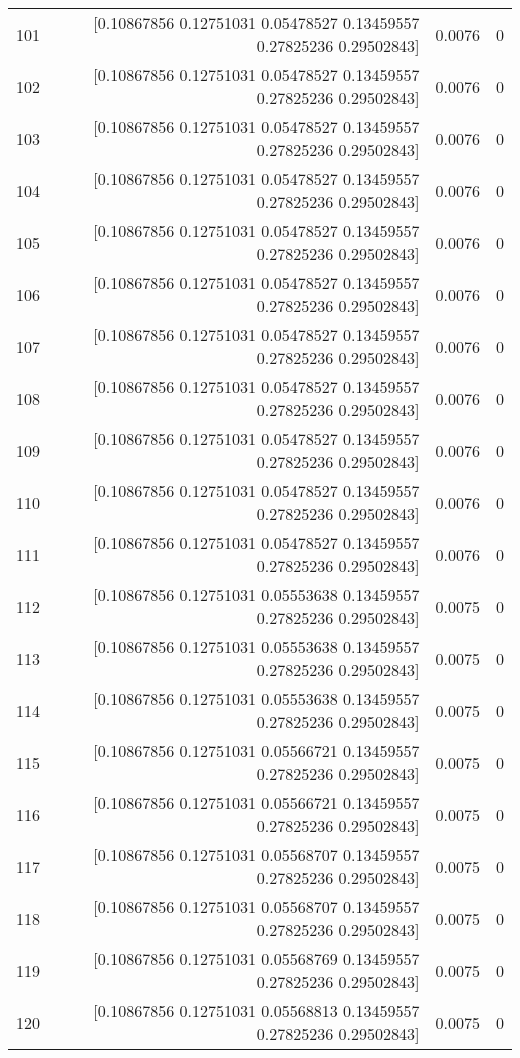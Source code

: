 \begin{longtable}{lrrr}
101 & [0.10867856 0.12751031 0.05478527 0.13459557 0.27825236 0.29502843] & 0.0076 & 0 \\
102 & [0.10867856 0.12751031 0.05478527 0.13459557 0.27825236 0.29502843] & 0.0076 & 0 \\
103 & [0.10867856 0.12751031 0.05478527 0.13459557 0.27825236 0.29502843] & 0.0076 & 0 \\
104 & [0.10867856 0.12751031 0.05478527 0.13459557 0.27825236 0.29502843] & 0.0076 & 0 \\
105 & [0.10867856 0.12751031 0.05478527 0.13459557 0.27825236 0.29502843] & 0.0076 & 0 \\
106 & [0.10867856 0.12751031 0.05478527 0.13459557 0.27825236 0.29502843] & 0.0076 & 0 \\
107 & [0.10867856 0.12751031 0.05478527 0.13459557 0.27825236 0.29502843] & 0.0076 & 0 \\
108 & [0.10867856 0.12751031 0.05478527 0.13459557 0.27825236 0.29502843] & 0.0076 & 0 \\
109 & [0.10867856 0.12751031 0.05478527 0.13459557 0.27825236 0.29502843] & 0.0076 & 0 \\
110 & [0.10867856 0.12751031 0.05478527 0.13459557 0.27825236 0.29502843] & 0.0076 & 0 \\
111 & [0.10867856 0.12751031 0.05478527 0.13459557 0.27825236 0.29502843] & 0.0076 & 0 \\
112 & [0.10867856 0.12751031 0.05553638 0.13459557 0.27825236 0.29502843] & 0.0075 & 0 \\
113 & [0.10867856 0.12751031 0.05553638 0.13459557 0.27825236 0.29502843] & 0.0075 & 0 \\
114 & [0.10867856 0.12751031 0.05553638 0.13459557 0.27825236 0.29502843] & 0.0075 & 0 \\
115 & [0.10867856 0.12751031 0.05566721 0.13459557 0.27825236 0.29502843] & 0.0075 & 0 \\
116 & [0.10867856 0.12751031 0.05566721 0.13459557 0.27825236 0.29502843] & 0.0075 & 0 \\
117 & [0.10867856 0.12751031 0.05568707 0.13459557 0.27825236 0.29502843] & 0.0075 & 0 \\
118 & [0.10867856 0.12751031 0.05568707 0.13459557 0.27825236 0.29502843] & 0.0075 & 0 \\
119 & [0.10867856 0.12751031 0.05568769 0.13459557 0.27825236 0.29502843] & 0.0075 & 0 \\
120 & [0.10867856 0.12751031 0.05568813 0.13459557 0.27825236 0.29502843] & 0.0075 & 0 \\

\end{longtable}
